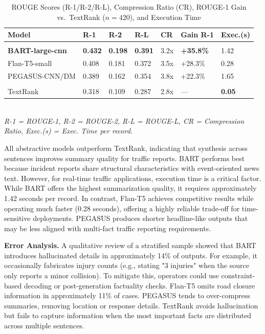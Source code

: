 \documentclass[10pt,conference]{IEEEtran}
\begin{document}
\begin{table}[htbp]
\caption{ROUGE Scores (R-1/R-2/R-L), Compression Ratio (CR),
ROUGE-1 Gain vs.\ TextRank ($n = 420$), and Execution Time}
\label{tab:rouge}
\centering
\renewcommand{\arraystretch}{1.1}
\setlength{\tabcolsep}{3pt}
\begin{tabular}{|p{2.25cm}|C{0.6cm}|C{0.6cm}|C{0.6cm}|C{0.55cm}|C{0.95cm}|C{1.1cm}|}
\hline
{}
\rule{0pt}{2.4ex}\textbf{Model} & \textbf{R-1} & \textbf{R-2} & \textbf{R-L} & \textbf{CR} & \textbf{Gain R-1} & \textbf{Exec.(s)} \\
\hline
{}
\\
\hline
{}
\textbf{BART-large-cnn} & \textbf{0.432} & \textbf{0.198} & \textbf{0.391} & 3.2x & \textbf{+35.8\%} & 1.42 \\
\hline
Flan-T5-small & 0.408 & 0.181 & 0.372 & 3.5x & +28.3\% & 0.28 \\
\hline
PEGASUS-CNN/DM & 0.389 & 0.162 & 0.354 & 3.8x & +22.3\% & 1.65 \\
\hline
{}
\\
\hline
{}
TextRank & 0.318 & 0.109 & 0.287 & 2.8x & --- & \textbf{0.05} \\
\hline
\end{tabular}
\\[2pt]
{\small\textit{R-1 = ROUGE-1, R-2 = ROUGE-2, R-L = ROUGE-L, CR = Compression Ratio, Exec.(s) = Exec. Time per record.}}
\end{table}

All abstractive models outperform TextRank, indicating that synthesis
across sentences improves summary quality for traffic reports. BART
performs best because incident reports share structural characteristics
with event-oriented news text. However, for real-time traffic applications, execution time is a critical factor. While BART offers the highest summarization quality, it requires approximately 1.42 seconds per record. In contrast, Flan-T5 achieves competitive results while operating much faster (0.28 seconds), offering a highly reliable trade-off for time-sensitive deployments. PEGASUS produces shorter headline-like outputs that may be less aligned with multi-fact traffic reporting requirements.

\textbf{Error Analysis.}
A qualitative review of a stratified sample showed that BART introduces
hallucinated details in approximately 14\% of outputs. For example, it occasionally fabricates injury counts (e.g., stating "3 injuries" when the source only reports a minor collision). To mitigate this, operators could use constraint-based decoding or post-generation factuality checks. Flan-T5 omits road closure information in
approximately 11\% of cases. PEGASUS tends to over-compress summaries,
removing location or response details. TextRank avoids hallucination but
fails to capture information when the most important facts are
distributed across multiple sentences.
\end{document}
